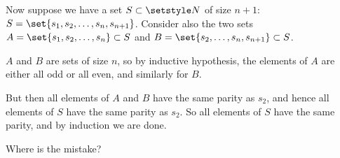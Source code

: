 \begin{enumerate}
\begin{tcolorbox}
   Now suppose we have a set \(S \subset \Naturals\) of size \(n + 1\):
   \(S = \set{s_1, s_2, \dotsc, s_n, s_{n + 1}}\). Consider also the two sets
   \(A = \set{s_1, s_2, \dotsc, s_n} \subset S\) and
   \(B = \set{s_2, \dotsc, s_n, s_{n + 1}} \subset S\).

   \(A\) and \(B\) are sets of size \(n\), so by inductive hypothesis, the
   elements of \(A\) are either all odd or all even, and similarly for \(B\).

   But then all elements of \(A\) and \(B\) have the same parity as \(s_2\), and
   hence all elements of \(S\) have the same parity as \(s_2\). So all elements
   of \(S\) have the same parity, and by induction we are done.
  \end{tcolorbox}
  Where is the mistake?
\end{enumerate}
